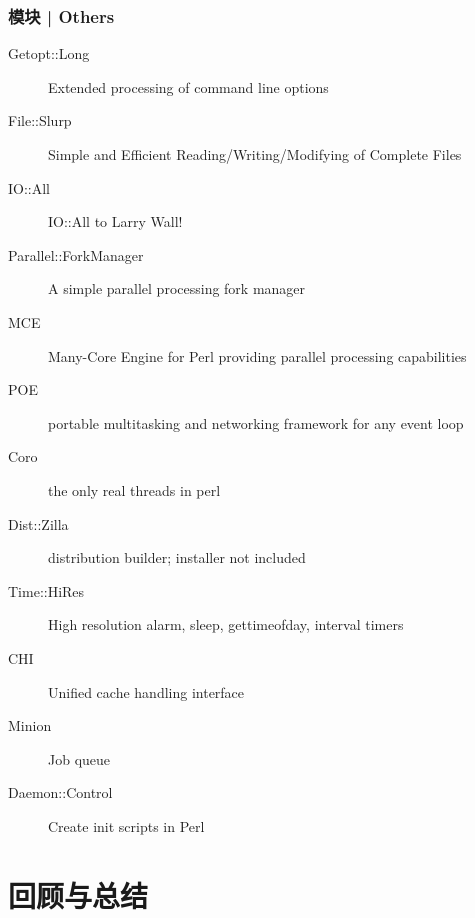 \begin{frame}
  \frametitle{模块 | Others}
    \begin{description}
      \item[\alert{Getopt::Long}] Extended processing of command line options
      \item[File::Slurp] Simple and Efficient Reading/Writing/Modifying of Complete Files
      \item[IO::All] IO::All to Larry Wall!
      \item[\alert{Parallel::ForkManager}] A simple parallel processing fork manager
      \item[MCE] Many-Core Engine for Perl providing parallel processing capabilities
      \item[POE] portable multitasking and networking framework for any event loop
      \item[Coro] the only real threads in perl
      \item[Dist::Zilla] distribution builder; installer not included
      \item[Time::HiRes] High resolution alarm, sleep, gettimeofday, interval timers
      \item[CHI] Unified cache handling interface
      \item[Minion] Job queue
      \item[Daemon::Control]Create init scripts in Perl
    \end{description}
\end{frame}

\section{回顾与总结}
